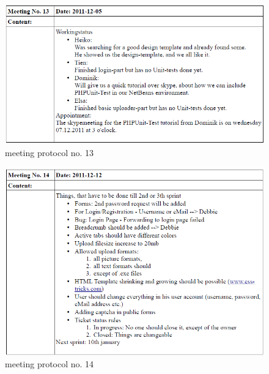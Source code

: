 \begin{appendix}
\begin{figure}[htbp]
  \centering
    \includegraphics[width=\textwidth]{images/a_meetings/meeting_13.png}
  \caption{meeting protocol no. 13}
  \label{fig:meeting protocol no. 13}
\end{figure}

\begin{figure}[htbp]
  \centering
    \includegraphics[width=\textwidth]{images/a_meetings/meeting_14.png}
  \caption{meeting protocol no. 14}
  \label{fig:meeting protocol no. 14}
\end{figure}


\end{appendix}
